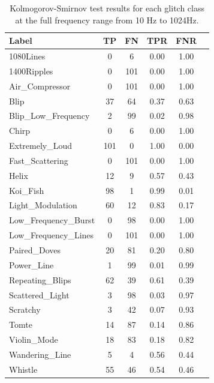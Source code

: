 \documentclass[12pt]{article}
\begin{document}
\begin{table}[H]
  \centering
  \begin{tabular}{lccccc}
  \toprule
  Label & TP & FN & TPR & FNR \\
  \midrule
  1080Lines & 0 & 6 & 0.00 & 1.00 \\
  1400Ripples & 0 & 101 & 0.00 & 1.00 \\
  Air\_Compressor & 0 & 101 & 0.00 & 1.00 \\
  Blip & 37 & 64 & 0.37 & 0.63 \\
  Blip\_Low\_Frequency & 2 & 99 & 0.02 & 0.98 \\
  Chirp & 0 & 6 & 0.00 & 1.00 \\
  Extremely\_Loud & 101 & 0 & 1.00 & 0.00 \\
  Fast\_Scattering & 0 & 101 & 0.00 & 1.00 \\
  Helix & 12 & 9 & 0.57 & 0.43 \\
  Koi\_Fish & 98 & 1 & 0.99 & 0.01 \\
  Light\_Modulation & 60 & 12 & 0.83 & 0.17 \\
  Low\_Frequency\_Burst & 0 & 98 & 0.00 & 1.00 \\
  Low\_Frequency\_Lines & 0 & 101 & 0.00 & 1.00 \\
  Paired\_Doves & 20 & 81 & 0.20 & 0.80 \\
  Power\_Line & 1 & 99 & 0.01 & 0.99 \\
  Repeating\_Blips & 62 & 39 & 0.61 & 0.39 \\
  Scattered\_Light & 3 & 98 & 0.03 & 0.97 \\
  Scratchy & 3 & 42 & 0.07 & 0.93 \\
  Tomte & 14 & 87 & 0.14 & 0.86 \\
  Violin\_Mode & 18 & 83 & 0.18 & 0.82 \\
  Wandering\_Line & 5 & 4 & 0.56 & 0.44 \\
  Whistle & 55 & 46 & 0.54 & 0.46 \\
  \bottomrule
  \end{tabular}
  \caption{Kolmogorov-Smirnov test results for each glitch class at the full frequency range from 10 Hz to 1024Hz.}
  \label{tab:ks_full_range_results}
\end{table}
\end{document}
